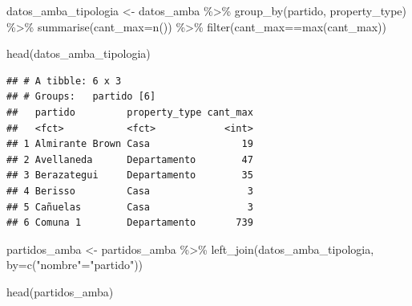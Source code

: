 \documentclass[
  spanish,
]{book}
\newenvironment{Shaded}{\begin{snugshade}}{\end{snugshade}}
\newcommand{\AttributeTok}[1]{\textcolor[rgb]{0.77,0.63,0.00}{#1}}
\newcommand{\FunctionTok}[1]{\textcolor[rgb]{0.00,0.00,0.00}{#1}}
\newcommand{\NormalTok}[1]{#1}
\newcommand{\OtherTok}[1]{\textcolor[rgb]{0.56,0.35,0.01}{#1}}
\newcommand{\SpecialCharTok}[1]{\textcolor[rgb]{0.00,0.00,0.00}{#1}}
\newcommand{\StringTok}[1]{\textcolor[rgb]{0.31,0.60,0.02}{#1}}
\begin{document}
\begin{Shaded}
\begin{Highlighting}[]
\NormalTok{datos\_amba\_tipologia }\OtherTok{\textless{}{-}}\NormalTok{ datos\_amba }\SpecialCharTok{\%\textgreater{}\%}
  \FunctionTok{group\_by}\NormalTok{(partido, property\_type) }\SpecialCharTok{\%\textgreater{}\%}
  \FunctionTok{summarise}\NormalTok{(}\AttributeTok{cant\_max=}\FunctionTok{n}\NormalTok{()) }\SpecialCharTok{\%\textgreater{}\%}
  \FunctionTok{filter}\NormalTok{(cant\_max}\SpecialCharTok{==}\FunctionTok{max}\NormalTok{(cant\_max))}
\end{Highlighting}
\end{Shaded}

\begin{Shaded}
\begin{Highlighting}[]
\FunctionTok{head}\NormalTok{(datos\_amba\_tipologia)}
\end{Highlighting}
\end{Shaded}

\begin{verbatim}
## # A tibble: 6 x 3
## # Groups:   partido [6]
##   partido         property_type cant_max
##   <fct>           <fct>            <int>
## 1 Almirante Brown Casa                19
## 2 Avellaneda      Departamento        47
## 3 Berazategui     Departamento        35
## 4 Berisso         Casa                 3
## 5 Cañuelas        Casa                 3
## 6 Comuna 1        Departamento       739
\end{verbatim}

\begin{Shaded}
\begin{Highlighting}[]
\NormalTok{partidos\_amba }\OtherTok{\textless{}{-}}\NormalTok{ partidos\_amba }\SpecialCharTok{\%\textgreater{}\%}
  \FunctionTok{left\_join}\NormalTok{(datos\_amba\_tipologia, }\AttributeTok{by=}\FunctionTok{c}\NormalTok{(}\StringTok{"nombre"}\OtherTok{=}\StringTok{"partido"}\NormalTok{))}
\end{Highlighting}
\end{Shaded}

\begin{Shaded}
\begin{Highlighting}[]
\FunctionTok{head}\NormalTok{(partidos\_amba)}
\end{Highlighting}
\end{Shaded}
\end{document}
